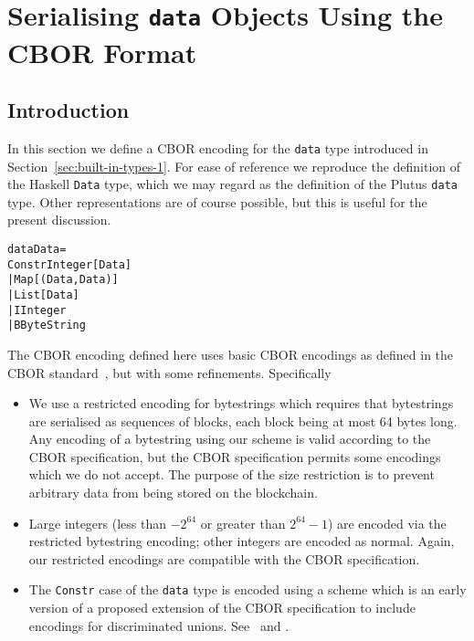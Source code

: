 \chapter{Serialising \texttt{data} Objects Using the CBOR Format}
\label{appendix:data-cbor-encoding}

\section{Introduction}
In this section we define a CBOR encoding for the \texttt{data} type introduced
in Section~\ref{sec:built-in-types-1}.  For ease of reference we reproduce
the definition of the Haskell \texttt{Data} type, which we may regard as the
definition of the Plutus \texttt{data} type. Other representations are of course
possible, but this is useful for the present discussion.

\begin{alltt}
   data Data =
      Constr Integer [Data]
      | Map [(Data, Data)]
      | List [Data]
      | I Integer
      | B ByteString
\end{alltt}

\noindent The CBOR encoding defined here uses basic CBOR encodings as defined in
the CBOR standard~\cite{rfc8949-CBOR}, but with some refinements. Specifically

\begin{itemize}
\item We use a restricted encoding for bytestrings which requires that
  bytestrings are serialised as sequences of blocks, each block being at most 64
  bytes long.  Any encoding of a bytestring using our scheme is valid according
  to the CBOR specification, but the CBOR specification permits some encodings
  which we do not accept. The purpose of the size restriction is to prevent
  arbitrary data from being stored on the blockchain.
\item Large integers (less than $-2^{64}$ or greater than $2^{64}-1$) are
  encoded via the restricted bytestring encoding; other integers are encoded as
  normal. Again, our restricted encodings are compatible with the CBOR
  specification.
\item The \texttt{Constr} case of the \texttt{data} type is encoded using a
  scheme which is an early version of a proposed extension of the CBOR
  specification to include encodings for discriminated unions.
  See~\cite{CBOR-alternatives} and \cite[Section 9.1]{CBOR-notable-tags}.
  \end{itemize}


